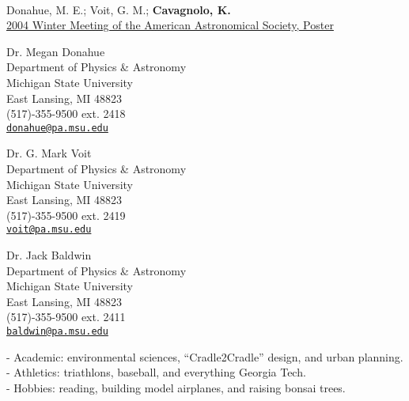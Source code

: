 \documentclass[11pt]{cv}
\begin{document}
\begin{llist}
{}\\
Donahue, M. E.; Voit, G. M.; {\bf Cavagnolo, K.}\\
\href{http://adsabs.harvard.edu/abs/2004AAS...205.6020D}{2004 Winter
Meeting of the American Astronomical Society, Poster}



{\sc Dr. Megan Donahue}\\
Department of Physics \& Astronomy\\
Michigan State University\\
East Lansing, MI 48823\\
(517)-355-9500 ext. 2418\\
\href{mailto:donahue@pa.msu.edu}{\tt donahue@pa.msu.edu}

{\sc Dr. G. Mark Voit}\\
Department of Physics \& Astronomy\\
Michigan State University\\
East Lansing, MI 48823\\
(517)-355-9500 ext. 2419\\
\href{mailto:voit@pa.msu.edu}{\tt voit@pa.msu.edu}

{\sc Dr. Jack Baldwin}\\
Department of Physics \& Astronomy\\
Michigan State University\\
East Lansing, MI 48823\\
(517)-355-9500 ext. 2411\\
\href{mailto:baldwin@pa.msu.edu}{\tt baldwin@pa.msu.edu}


- Academic: environmental sciences, ``Cradle2Cradle''
design, and urban planning.\\
- Athletics: triathlons, baseball, and everything Georgia Tech.\\
- Hobbies: reading, building model airplanes, and raising bonsai trees.\\

\end{llist}
\end{document}
